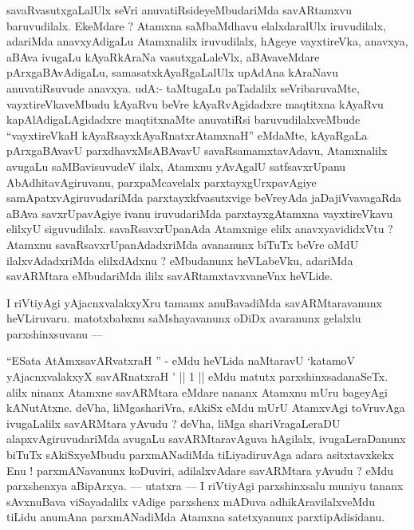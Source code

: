 \begin{artha}
savaRvasutxgaLalUlx seVri anuvatiRsideyeMbudariMda savARtamxvu baru\-vudilalx. EkeMdare ? Atamxna saMbaMdhavu elalxdaralUlx iruvudilalx, adariMda anavxyAdigaLu Atamxnalilx iruvudilalx, hAgeye vayxtireVka, anavxya, aBAva ivugaLu kAyaRkAraNa vasutxgaLaleVlx, aBAvaveMdare pArxgaBAvAdigaLu, samasatxkAyaRgaLalUlx upAdAna kAraNavu anuvatiRsuvude anavxya. udA:- taMtugaLu paTadalilx seVribaru\-vaMte, vayxtireVkaveMbudu kAyaRvu beVre kAyaRvAgidadxre maqtitxna kAyaRvu kapAlAdi\-gaLAgidadxre maqtitxnaMte anuvatiRsi baruvudilalxveMbude ``vayxtireVkaH kAyaRsayx\break kAyaRnatxrAtamxnaH'' eMdaMte, kAyaRgaLa pArxgaBAvavU parxdhavxMsABAvavU savaR\-samamxtavAdavu, Atamxnalilx avugaLu saMBavisuvudeV ilalx, Atamxnu yAvAgalU satfsavxrUpanu AbAdhitavAgiruvanu, parxpaMcavelalx parxtayxgUrxpavAgiye samApatxvAgiru\-vudariMda parxtayxkfvasutxvige beVreyAda jaDajiVvavagaRda aBAva savxrUpavAgiye ivanu iruvudariMda parxtayxgAtamxna vayxtireVkavu elilxyU siguvudilalx. savaRsavxrUpa\-nAda Atamxnige elilx anavxyavididxVtu ? Atamxnu savaRsavxrUpanAdadxriMda \-avananunx biTuTx beVre oMdU ilalxvAdadxriMda elilxdAdxnu ? eMbudanunx heVLabeVku, adariMda savARMtara eMbudariMda ililx savARtamxtavxvaneVnx heVLide.
\end{artha}

\begin{artha}
I riVtiyAgi yAjacnxvalakxyXru tamamx anuBavadiMda savARMtaravanunx heVLiruvaru. matotxbabxnu saMshayavanunx oDiDx avaranunx gelalxlu parxshinxsuvanu ---
\end{artha}


\begin{artha}
``ESata AtAmxsavARvatxraH '' - eMdu heVLida naMtaravU `katamoV yAjacnxvalakxyX savARnatxraH ' || 1 || eMdu matutx parxshinxsadanaSeTx. alilx ninanx Atamxne savARMtara eMdare nananx Atamxnu mUru bageyAgi kANutAtxne. deVha, liMgashariVra, sAkiSx eMdu mUrU AtamxvAgi toVruvAga ivugaLalilx savARMtara yAvudu ? deVha, liMga shariVragaLeraDU alapxvAgiruvudariMda avugaLu savARMtaravAguva hAgilalx, ivugaLeraDanunx biTuTx sAkiSxyeMbudu parxmANadiMda tiLiyadiruvAga adara asitxtavxkekx Enu ! parxmANavanunx koDuviri, adilalxvAdare savARMtara yAvudu ? eMdu parxshenxya aBipArxya. --- utatxra --- I riVtiyAgi parxshinxsalu muniyu tananx sAvxnuBava viSayadalilx vAdige parxshenx mADuva adhikAravilalxveMdu tiLidu anumAna parxmANadiMda Atamxna satetxyanunx parxtipAdisidanu. 
\end{artha}

